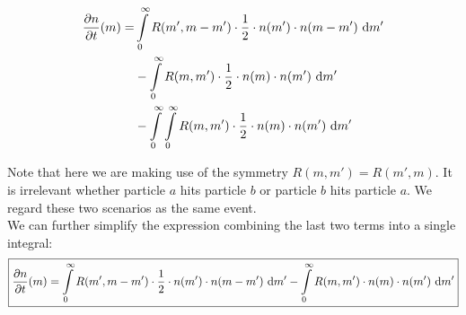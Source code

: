    \begin{align}
        \frac{\partial n}{\partial t}(m)
            =
                &\int\limits_0^\infty
                R(m',m-m') \cdot \frac{1}{2}
                \cdot n(m')
                \cdot n(m-m')
                \ \text{d} m'
            \\ &
                -
                \int\limits_0^\infty
                R(m,m') \cdot \frac{1}{2}
                \cdot n(m)
                \cdot n(m')
                \ \text{d} m'
            \\ &
                -
                \int\limits_0^\infty
                \int\limits_0^\infty
                R(m,m') \cdot \frac{1}{2}
                \cdot n(m)
                \cdot n(m')
                \ \text{d} m'
    \end{align}

    Note that here we are making use of the symmetry $R(m,m')=R(m',m)$. It is irrelevant whether 
    particle $a$ hits particle $b$ or particle $b$ hits particle $a$. We regard these two 
    scenarios as the same event. \\
 
    We can further simplify the expression combining the last two terms into a single integral:
    \begin{align}
        \boxed{\frac{\partial n}{\partial t}(m)
            =
                \int\limits_0^\infty
                R(m',m-m') \cdot \frac{1}{2}
                \cdot n(m')
                \cdot n(m-m')
                \ \text{d} m'
                -
                \int\limits_0^\infty
                R(m,m')
                \cdot n(m)
                \cdot n(m')
                \ \text{d} m'
            }
    \end{align}

     \\
     \\


